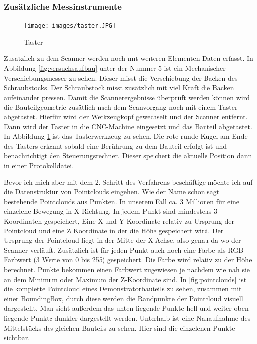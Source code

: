 \documentclass[../main.tex]{subfiles}
\begin{document}
\subsubsection{Zusätzliche Messinstrumente}

\begin{figure}
    \texttt{[image: images/taster.JPG]}
    \caption{Taster}
    \label{fig:taster}
\end{figure}

Zusätzlich zu dem Scanner werden noch mit weiteren Elementen Daten erfasst.
In Abbildung \ref{fig:versuchsaufbau} unter der Nummer 5 ist ein Mechanischer 
Verschiebungsmesser zu sehen. Dieser misst die Verschiebung der Backen des 
Schraubstocks. Der Schraubstock misst zusätzlich mit viel Kraft die Backen 
aufeinander pressen. Damit die Scannerergebnisse überprüft werden können 
wird die Bauteilgeometrie zusätlich nach dem Scanvorgang noch mit einem Taster
abgetastet. Hierfür wird der Werkzeugkopf gewechselt und der Scanner entfernt.
Dann wird der Taster in die CNC-Machine eingesetzt und das Bauteil abgetastet.
In Abbildung \ref{fig:taster} ist das Tasterwerkzeug zu sehen. Die rote runde
Kugel am Ende des Tasters erkennt sobald eine Berührung zu dem Bauteil erfolgt ist 
und benachrichtigt den Steuerungsrechner. Dieser speichert die aktuelle Position 
dann in einer Protokolldatei. 

Bevor ich mich aber mit dem 2. Schritt des Verfahrens beschäftige möchte ich auf die 
Datenstruktur von Pointclouds eingehen. Wie der Name schon sagt bestehende
Pointclouds aus Punkten. In unserem Fall ca. 3 Millionen für eine einzelene
Bewegung in X-Richtung. In jedem Punkt sind mindestens 3 Koordinaten gespeichert, 
Eine X und Y Koordinate relativ zu Ursprung der Pointcloud und eine Z Koordinate 
in der die Höhe gespeichert wird. Der Ursprung der Pointcloud liegt in der Mitte 
der X-Achse, also genau da wo der Scanner verläuft.
Zusätzlich ist für jeden Punkt auch noch eine Farbe als RGB-Farbwert
(3 Werte von 0 bis 255) gespeichert. Die Farbe wird relativ zu der Höhe
berechnet. Punkte bekommen einen Farbwert zugewiesen je nachdem wie nah 
sie an dem Minimum oder Maximum der Z-Koordinate sind. 
In \ref{fig:pointclouds} ist die komplette Pointcloud eines Demonstratorbauteils 
zu sehen, zusammen mit einer BoundingBox, durch diese werden die Randpunkte
der Pointcloud visuell dargestellt. Man sieht außerdem das unten liegende Punkte
hell und weiter oben liegende Punkte dunkler dargestellt werden.
Unterhalb ist eine Nahaufnahme des Mittelstücks des gleichen Bauteils zu sehen. 
Hier sind die einzelenen Punkte sichtbar.
\end{document}
